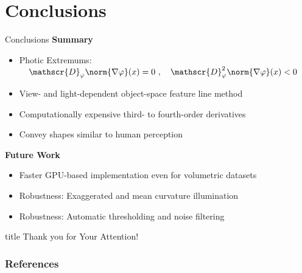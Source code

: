 \documentclass[aspectratio=169]{beamer}
\begin{document}
\section{Conclusions}
  \begin{frame}{Conclusions}
    \textbf{Summary}
    \pause
    \begin{itemize}
      \item<+-> Photic Extremums: $\quad \mathscr{D}_\varphi \norm{\nabla \varphi}(x) = 0\ ,\quad \mathscr{D}_\varphi^2 \norm{\nabla \varphi}(x) < 0$
      \item<+-> View- and light-dependent object-space feature line method
      \item<+-> Computationally expensive third- to fourth-order derivatives
      \item<+-> Convey shapes similar to human perception
    \end{itemize}
    \bigskip
    \pause
    \textbf{Future Work}
    \begin{itemize}
      \item<+-> Faster GPU-based implementation even for volumetric datasets
      \item<+-> Robustness: Exaggerated and mean curvature illumination
      \item<+-> Robustness: Automatic thresholding and noise filtering
    \end{itemize}
  \end{frame}

\begin{frame}
  \vfill
  \centering
  \begin{beamercolorbox}[sep=8pt,center,shadow=true,rounded=true]{title}
    Thank you for Your Attention!%
    \par%
  \end{beamercolorbox}
  \vfill
\end{frame}

\begin{frame}
  \frametitle{References}
  \AtNextBibliography{\tiny}
  \begin{multicols}{2}
    \nocite{decarlo2003}
    \nocite{kolomenkin2008}
    \nocite{rusinkiewicz2006}
    \nocite{meyer2001}
    \nocite{kindlmann2003}
    \printbibliography
  \end{multicols}
\end{frame}
\end{document}
